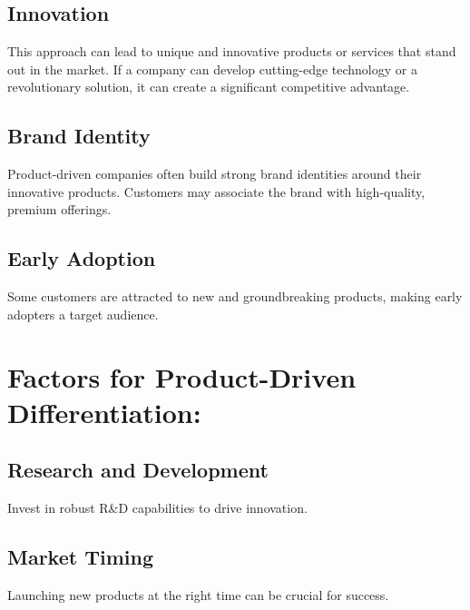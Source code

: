 \documentclass[
]{book}
\begin{document}
\hypertarget{innovation}{%
\subsection{Innovation}\label{innovation}}

This approach can lead to unique and innovative products or services that stand out in the market. If a company can develop cutting-edge technology or a revolutionary solution, it can create a significant competitive advantage.

\hypertarget{brand-identity}{%
\subsection{Brand Identity}\label{brand-identity}}

Product-driven companies often build strong brand identities around their innovative products. Customers may associate the brand with high-quality, premium offerings.

\hypertarget{early-adoption}{%
\subsection{Early Adoption}\label{early-adoption}}

Some customers are attracted to new and groundbreaking products, making early adopters a target audience.

\hypertarget{factors-for-product-driven-differentiation}{%
\section{Factors for Product-Driven Differentiation:}\label{factors-for-product-driven-differentiation}}

\hypertarget{research-and-development}{%
\subsection{Research and Development}\label{research-and-development}}

Invest in robust R\&D capabilities to drive innovation.

\hypertarget{market-timing}{%
\subsection{Market Timing}\label{market-timing}}

Launching new products at the right time can be crucial for success.
\end{document}
